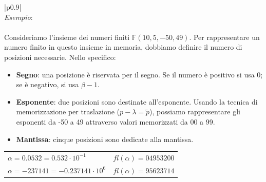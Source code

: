 \documentclass{article}
\newenvironment{example}
{\begin{center}
        \begin{tabular}{|p{0.9\textwidth}|}
            \hline \\ 
            \textit{Esempio}: \\\\ 
        }
        {
            \\\\ \hline
        \end{tabular}
    \end{center}
}
\begin{document}
\newpage
\begin{example}
   Consideriamo l'insieme dei numeri finiti $\mathbb{F}(10,5,-50,49)$. Per
   rappresentare un numero finito in questo insieme in memoria, dobbiamo
   definire il numero di posizioni necessarie. Nello specifico:
   \begin{itemize}
       \item\textbf{Segno}: una posizione è riservata per il segno. Se il numero
           è positivo si usa 0; se è negativo, si usa $\beta-1$.
        \item\textbf{Esponente}: due posizioni sono destinate all'esponente.
            Usando la tecnica di memorizzazione per traslazione
            ($p-\lambda=\tilde{p}$), possiamo
            rappresentare gli esponenti da -50 a 49 attraverso valori
            memorizzati da 00 a 99.
        \item\textbf{Mantissa}: cinque posizioni sono dedicate alla mantissa.
   \end{itemize}
   \begin{center}
        \begin{tabular}{ll}
            $\alpha=0.0532=0.532\cdot10^{-1}$ & $fl(\alpha)=04953200$\\ 
            $\alpha=-237141=-0.237141\cdot10^{6}$ & $fl(\alpha)=95623714$
        \end{tabular}
   \end{center}
\end{example}
\end{document}
